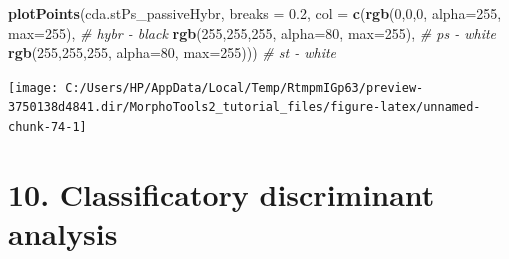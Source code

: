 \documentclass[
]{article}
\newenvironment{Shaded}{\begin{snugshade}}{\end{snugshade}}
\newcommand{\CommentTok}[1]{\textcolor[rgb]{0.56,0.35,0.01}{\textit{#1}}}
\newcommand{\DataTypeTok}[1]{\textcolor[rgb]{0.13,0.29,0.53}{#1}}
\newcommand{\DecValTok}[1]{\textcolor[rgb]{0.00,0.00,0.81}{#1}}
\newcommand{\FloatTok}[1]{\textcolor[rgb]{0.00,0.00,0.81}{#1}}
\newcommand{\KeywordTok}[1]{\textcolor[rgb]{0.13,0.29,0.53}{\textbf{#1}}}
\newcommand{\NormalTok}[1]{#1}
\begin{document}
\begin{Shaded}
\begin{Highlighting}[]
\KeywordTok{plotPoints}\NormalTok{(cda.stPs_passiveHybr, }\DataTypeTok{breaks =} \FloatTok{0.2}\NormalTok{,}
                \DataTypeTok{col =} \KeywordTok{c}\NormalTok{(}\KeywordTok{rgb}\NormalTok{(}\DecValTok{0}\NormalTok{,}\DecValTok{0}\NormalTok{,}\DecValTok{0}\NormalTok{, }\DataTypeTok{alpha=}\DecValTok{255}\NormalTok{, }\DataTypeTok{max=}\DecValTok{255}\NormalTok{), }\CommentTok{# hybr - black}
                        \KeywordTok{rgb}\NormalTok{(}\DecValTok{255}\NormalTok{,}\DecValTok{255}\NormalTok{,}\DecValTok{255}\NormalTok{, }\DataTypeTok{alpha=}\DecValTok{80}\NormalTok{, }\DataTypeTok{max=}\DecValTok{255}\NormalTok{), }\CommentTok{# ps - white}
                        \KeywordTok{rgb}\NormalTok{(}\DecValTok{255}\NormalTok{,}\DecValTok{255}\NormalTok{,}\DecValTok{255}\NormalTok{, }\DataTypeTok{alpha=}\DecValTok{80}\NormalTok{, }\DataTypeTok{max=}\DecValTok{255}\NormalTok{))) }\CommentTok{# st - white }
\end{Highlighting}
\end{Shaded}

\begin{center}\texttt{[image: C:/Users/HP/AppData/Local/Temp/RtmpmIGp63/preview-3750138d4841.dir/MorphoTools2\_tutorial\_files/figure-latex/unnamed-chunk-74-1]} \end{center}

\newpage

\hypertarget{classificatory-discriminant-analysis}{%
\section{10. Classificatory discriminant
analysis}\label{classificatory-discriminant-analysis}}
\end{document}
